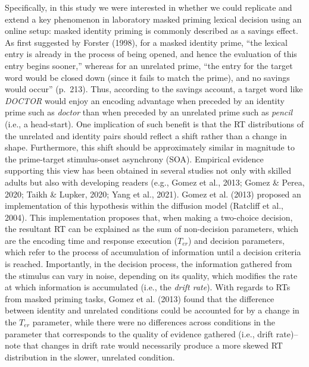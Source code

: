 \documentclass[
  english,
  man,floatsintext]{apa6}
\begin{document}
Specifically, in this study we were interested in whether we could replicate and extend a key phenomenon in laboratory masked priming lexical decision using an online setup: masked identity priming is commonly described as a savings effect. As first suggested by Forster (1998), for a masked identity prime, ``the lexical entry is already in the process of being opened, and hence the evaluation of this entry begins sooner,'' whereas for an unrelated prime, ``the entry for the target word would be closed down (since it fails to match the prime), and no savings would occur'' (p.~213). Thus, according to the savings account, a target word like \emph{DOCTOR} would enjoy an encoding advantage when preceded by an identity prime such as \emph{doctor} than when preceded by an unrelated prime such as \emph{pencil} (i.e., a head-start). One implication of such benefit is that the RT distributions of the unrelated and identity pairs should reflect a shift rather than a change in shape. Furthermore, this shift should be approximately similar in magnitude to the prime-target stimulus-onset asynchrony (SOA). Empirical evidence supporting this view has been obtained in several studies not only with skilled adults but also with developing readers (e.g., Gomez et al., 2013; Gomez \& Perea, 2020; Taikh \& Lupker, 2020; Yang et al., 2021). Gomez et al. (2013) proposed an implementation of this hypothesis within the diffusion model (Ratcliff et al., 2004). This implementation proposes that, when making a two-choice decision, the resultant RT can be explained as the sum of non-decision parameters, which are the encoding time and response execution (\(T_{er}\)) and decision parameters, which refer to the process of accumulation of information until a decision criteria is reached. Importantly, in the decision process, the information gathered from the stimulus can vary in noise, depending on its quality, which modifies the rate at which information is accumulated (i.e., the \emph{drift rate}). With regards to RTs from masked priming tasks, Gomez et al. (2013) found that the difference between identity and unrelated conditions could be accounted for by a change in the \(T_{er}\) parameter, while there were no differences across conditions in the parameter that corresponds to the quality of evidence gathered (i.e., drift rate)--note that changes in drift rate would necessarily produce a more skewed RT distribution in the slower, unrelated condition.
\end{document}
